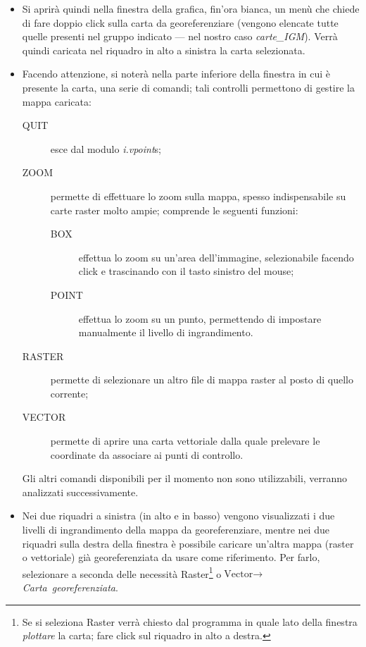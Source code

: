 			\begin{itemize}
				\item Si aprirà quindi nella finestra della grafica, fin'ora bianca, un menù che chiede di fare doppio click sulla carta da georeferenziare (vengono elencate tutte quelle presenti nel gruppo indicato --- nel nostro caso \emph{carte\_IGM}). Verrà quindi caricata nel riquadro in alto a sinistra la carta selezionata.
				\item Facendo attenzione, si noterà nella parte inferiore della finestra in cui è presente la carta, una serie di comandi; tali controlli permettono di gestire la mappa caricata:

				\begin{description}
					\item [{\textsf{QUIT}}] esce dal modulo \emph{i.vpoint}s;
					\item [{\textsf{ZOOM}}] permette di effettuare lo zoom sulla mappa, spesso indispensabile su carte raster molto ampie; comprende le seguenti funzioni:

					\begin{description}
						\item [{\textsf{BOX}}] effettua lo zoom su un'area dell'immagine, selezionabile facendo click e trascinando con il tasto sinistro del mouse; 
						\item [{\textsf{POINT}}] effettua lo zoom su un punto, permettendo di impostare manualmente il livello di ingrandimento.
					\end{description}
				\item [{\textsf{RASTER}}] permette di selezionare un altro file di mappa raster al posto di quello corrente;
				\item [{\textsf{VECTOR}}] permette di aprire una carta vettoriale dalla quale prelevare le coordinate da associare ai punti di controllo.
				\end{description}
				
				Gli altri comandi disponibili per il momento non sono utilizzabili, verranno analizzati successivamente.

				\item Nei due riquadri a sinistra (in alto e in basso) vengono visualizzati i due livelli di ingrandimento della mappa da georeferenziare, mentre nei due riquadri sulla destra della finestra è possibile caricare un'altra mappa (raster o vettoriale) già georeferenziata da usare come riferimento. Per farlo, selezionare a seconda delle necessità \textsf{Raster}\footnote{Se si seleziona \textsf{Raster} verrà chiesto dal programma in quale lato della finestra \emph{plottare} la carta; fare click sul riquadro in alto a destra.} o\textsf{$\text{Vector}\rightarrow$}\textsf{\emph{Carta~georeferenziata}}.
				

\end{itemize}
